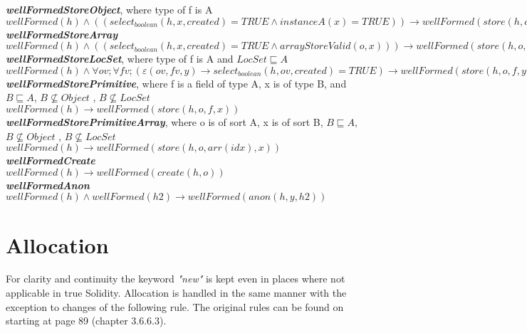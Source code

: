\documentclass{article}
\begin{document}
	\textit{\textbf{wellFormedStoreObject}}, where type of f is A \\
	$wellFormed(h) \land ((select_{boolean}(h, x, created) = TRUE \land instanceA(x) = TRUE)) \to wellFormed(store(h,o, f, x))$\\
	
	\textit{\textbf{wellFormedStoreArray}} \\
	$wellFormed(h) \land ( (select_{boolean}(h, x, created) = TRUE \land arrayStoreValid(o, x)))
	\to wellFormed(store(h,o,arr(idx), x)))$\\
	
	\textit{\textbf{wellFormedStoreLocSet}}, where type of f is A and $LocSet \sqsubseteq A$ \\
	$wellFormed(h)\land \forall ov;\forall f v;(\varepsilon (ov, f v, y) \to select_{boolean}(h,ov, created) = TRUE) \to wellFormed(store(h,o, f, y)) $\\
	
	\textit{\textbf{wellFormedStorePrimitive}}, where f is a field of type A, x is of type B, and $B \sqsubseteq A$, $B 
	\nsubseteq Object$ , $B \nsubseteq LocSet$\\
	$wellFormed(h) \to wellFormed(store(h,o, f, x))$\\
	
	\textit{\textbf{wellFormedStorePrimitiveArray}},  where o is of sort A, x is of sort B, $B \sqsubseteq A$, $B \nsubseteq Object$ , $B \nsubseteq LocSet$ \\
	$wellFormed(h) \to wellFormed(store(h,o,arr(idx), x))$\\
	
	\textit{\textbf{wellFormedCreate}} \\
	$wellFormed(h) \to wellFormed(create(h,o))$\\
	
	\textit{\textbf{wellFormedAnon}} \\
	$wellFormed(h)\land wellFormed(h2) \to wellFormed(anon(h, y,h2))$\\
	
	\section{Allocation} \label{alloc}
	For clarity and continuity the keyword \textit{"new"} is kept even in places where not applicable in true Solidity. Allocation is handled in the same manner with the exception to changes of the following rule. The original rules can be found on starting at page 89 (chapter 3.6.6.3). 
	
\end{document}
